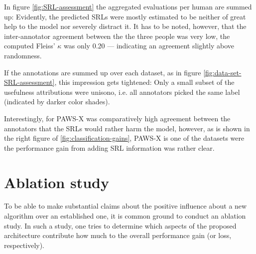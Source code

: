 {In figure \ref{fig:SRL-assessment} the aggregated evaluations per human are summed up:
Evidently, the predicted SRLs were mostly estimated to be neither of great help to the model
nor severely distract it. It has to be noted, however, that the inter-annotator agreement between
the the three people was very low, the computed Fleiss' $\kappa$ was only 0.20 --- indicating
an agreement slightly above randomness.

If the annotations are summed up over each dataset, as in figure \ref{fig:data-set-SRL-assessment},
this impression gets tightened: Only a small subset of the usefulness attributions were unisono,
i.e. all annotators picked the same label (indicated by darker color shades).


Interestingly, for PAWS-X was comparatively high agreement between the annotators that the SRLs would
rather harm the model, however, as is shown in the right figure of \ref{fig:classification-gains}, PAWS-X
is one of the datasets were the performance gain from adding SRL information was rather clear.














\section{Ablation study}
\label{sec:ablation}

To be able to make substantial claims about the positive influence about a new algorithm over an
established one, it is common ground to conduct an ablation study. In such a study, one tries to
determine which aspects of the proposed architecture contribute how much to the overall performance
gain (or loss, respectively).

}
